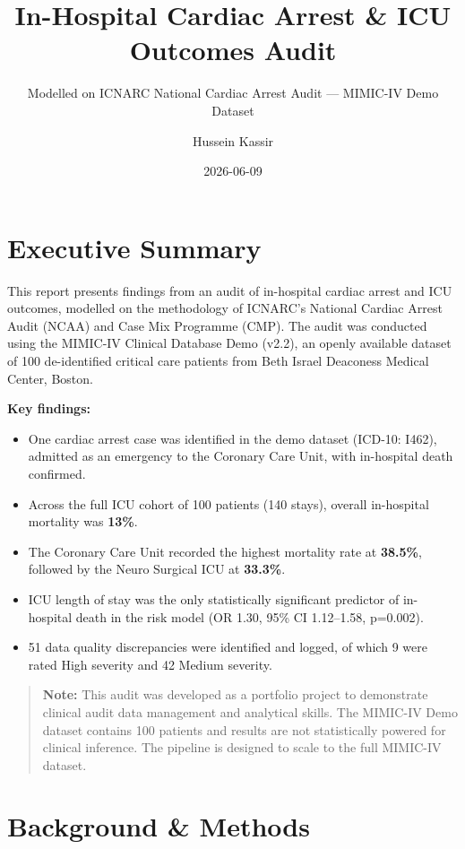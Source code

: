 \documentclass[
]{article}
\title{In-Hospital Cardiac Arrest \& ICU Outcomes Audit}
\subtitle{Modelled on ICNARC National Cardiac Arrest Audit --- MIMIC-IV
Demo Dataset}
\author{Hussein Kassir}
\date{2026-06-09}
\providecommand{\tightlist}{%
  \setlength{\itemsep}{0pt}\setlength{\parskip}{0pt}}
\begin{document}
\maketitle

{
\setcounter{tocdepth}{2}
\tableofcontents
}
\section{Executive Summary}\label{executive-summary}

This report presents findings from an audit of in-hospital cardiac
arrest and ICU outcomes, modelled on the methodology of ICNARC's
National Cardiac Arrest Audit (NCAA) and Case Mix Programme (CMP). The
audit was conducted using the MIMIC-IV Clinical Database Demo (v2.2), an
openly available dataset of 100 de-identified critical care patients
from Beth Israel Deaconess Medical Center, Boston.

\textbf{Key findings:}

\begin{itemize}
\tightlist
\item
  One cardiac arrest case was identified in the demo dataset (ICD-10:
  I462), admitted as an emergency to the Coronary Care Unit, with
  in-hospital death confirmed.
\item
  Across the full ICU cohort of 100 patients (140 stays), overall
  in-hospital mortality was \textbf{13\%}.
\item
  The Coronary Care Unit recorded the highest mortality rate at
  \textbf{38.5\%}, followed by the Neuro Surgical ICU at
  \textbf{33.3\%}.
\item
  ICU length of stay was the only statistically significant predictor of
  in-hospital death in the risk model (OR 1.30, 95\% CI 1.12--1.58,
  p=0.002).
\item
  51 data quality discrepancies were identified and logged, of which 9
  were rated High severity and 42 Medium severity.
\end{itemize}

\begin{quote}
\textbf{Note:} This audit was developed as a portfolio project to
demonstrate clinical audit data management and analytical skills. The
MIMIC-IV Demo dataset contains 100 patients and results are not
statistically powered for clinical inference. The pipeline is designed
to scale to the full MIMIC-IV dataset.
\end{quote}

\section{Background \& Methods}\label{background-methods}
\end{document}
